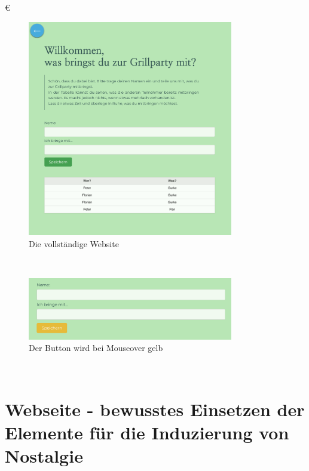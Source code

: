 €\documentclass[./dokumentation.tex]{subfiles}
\begin{document}
\begin{figure}[H]
    \centering
    \includegraphics[width=0.8\textwidth]{bilder/website-gelassen.png}
    \caption{Die vollständige Website}
    \label{fig21:website-gelassen}
    \end{figure}\\

\begin{figure}[H]
        \centering
        \includegraphics[width=0.8\textwidth]{bilder/website-gelassen-hover.png}
        \caption{Der Button wird bei Mouseover gelb}
        \label{fig22:website-gelassen-hover}
\end{figure}\\
    

\pagebreak
\section{Webseite - bewusstes Einsetzen der Elemente für die Induzierung von Nostalgie}


\pagebreak
\end{document}

